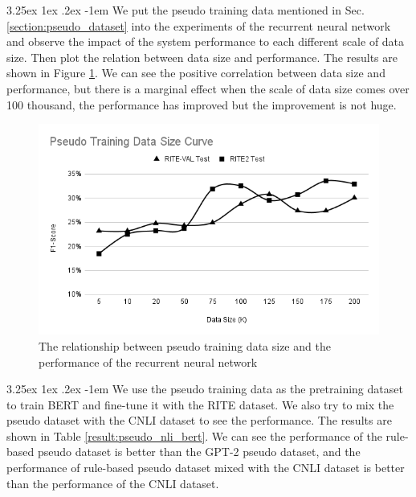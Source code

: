 \documentclass[12pt]{article}
\makeatletter
\renewcommand\paragraph{\@startsection{paragraph}{5}{\z@}%
  {3.25ex \@plus1ex \@minus.2ex}%
  {-1em}%
  {\normalfont\normalsize\bfseries}}
\makeatother
\begin{document}
\begin{CJK*}{UTF8}{bkai}
\begin{spacing}{1.77}
\paragraph{}
We put the pseudo training data mentioned in Sec. \ref{section:pseudo_dataset} into the experiments of the recurrent neural network and observe the impact of the system performance to each different scale of data size. Then plot the relation between data size and performance. The results are shown in Figure \ref{fig:pseudo_datasize}. We can see the positive correlation between data size and performance, but there is a marginal effect when the scale of data size comes over 100 thousand, the performance has improved but the improvement is not huge.

\begin{figure}[H]
  \centering
  \includegraphics[width=15cm]{PseudoTrainingDataSizeCurve.png}
  \caption[Pseudo Training Data Size Curve]{The relationship between pseudo training data size and the performance of the recurrent neural network}
  \label{fig:pseudo_datasize}
\end{figure}

\paragraph{}
We use the pseudo training data as the pretraining dataset to train BERT and fine-tune it with the RITE dataset. We also try to mix the pseudo dataset with the CNLI dataset to see the performance. The results are shown in Table \ref{result:pseudo_nli_bert}. We can see the performance of the rule-based pseudo dataset is better than the GPT-2 pseudo dataset, and the performance of rule-based pseudo dataset mixed with the CNLI dataset is better than the performance of the CNLI dataset.


\end{spacing}
\end{CJK*}
\end{document}
